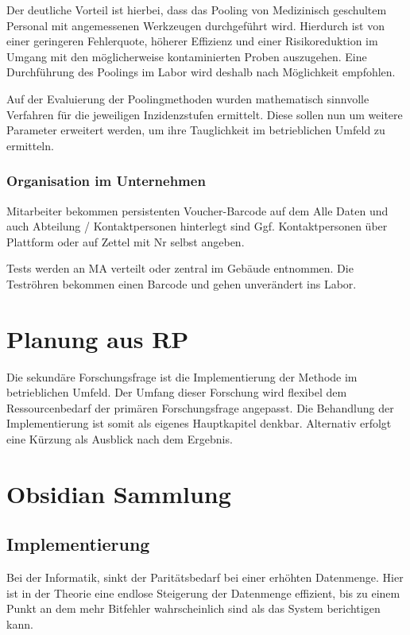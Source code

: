 Der deutliche Vorteil ist hierbei, dass das Pooling von Medizinisch geschultem Personal mit angemessenen Werkzeugen durchgeführt wird.
Hierdurch ist von einer geringeren Fehlerquote, höherer Effizienz und einer Risikoreduktion im Umgang mit den möglicherweise kontaminierten Proben auszugehen.
Eine Durchführung des Poolings im Labor wird deshalb nach Möglichkeit empfohlen.

Auf der Evaluierung der Poolingmethoden wurden mathematisch sinnvolle Verfahren für die jeweiligen Inzidenzstufen ermittelt.
Diese sollen nun um weitere Parameter erweitert werden, um ihre Tauglichkeit im betrieblichen Umfeld zu ermitteln.


\subsubsection{Organisation im Unternehmen}
Mitarbeiter bekommen persistenten Voucher-Barcode auf dem Alle Daten und auch Abteilung / Kontaktpersonen hinterlegt sind
Ggf. Kontaktpersonen über Plattform oder auf Zettel mit Nr selbst angeben.

Tests werden an MA verteilt oder zentral im Gebäude entnommen.
Die Teströhren bekommen einen Barcode und gehen unverändert ins Labor.



\cleardoublepage


\section{Planung aus RP}
Die sekundäre Forschungsfrage ist die Implementierung der Methode im betrieblichen Umfeld.
Der Umfang dieser Forschung wird flexibel dem Ressourcenbedarf der primären Forschungsfrage angepasst.
Die Behandlung der Implementierung ist somit als eigenes Hauptkapitel denkbar.
Alternativ erfolgt eine Kürzung als Ausblick nach dem Ergebnis.

\section{Obsidian Sammlung}
\subsection{Implementierung}
Bei der Informatik, sinkt der Paritätsbedarf bei einer erhöhten Datenmenge.
Hier ist in der Theorie eine endlose Steigerung der Datenmenge effizient, bis zu einem Punkt an dem mehr Bitfehler wahrscheinlich sind als das System berichtigen kann.

